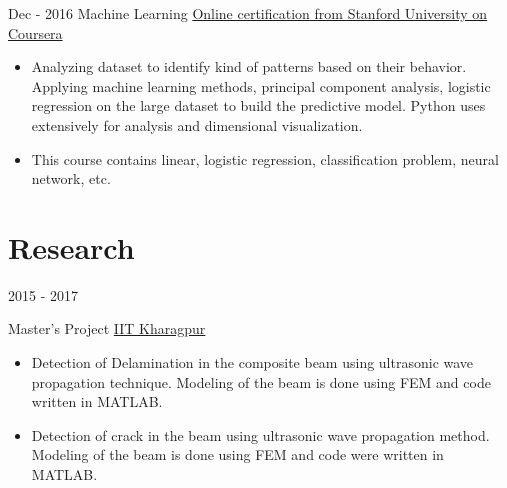 \documentclass[letterpaper]{twentysecondcv} %
\begin{document}
\begin{twenty} %
	
%
    \twentyitem
   		{Dec - 2016 }
   		{}
        {Machine Learning}
        {\href{https://www.coursera.org/accomplishments//}{Online certification from Stanford University on Coursera}}
        {}
        {
         \vspace{-2mm}
        {\begin{itemize}
        \item Analyzing dataset to identify kind of patterns based on their behavior. Applying machine learning methods, principal component analysis, logistic regression on the large dataset to build the predictive model. Python uses extensively for analysis and dimensional visualization.
        \item This course contains linear, logistic regression, classification problem, neural network, etc.
    \end{itemize}}
        }

\end{twenty}
\vspace{3 mm}
\section{Research}
\begin{twenty}
\twentyitem
    	{2015 - 2017}
    	
        {Master's Project}
        {\href{http://http://iitkgp.ac.in//}{IIT Kharagpur}}
        {}
        {
        	\vspace{-3mm}
        {\begin{itemize}
        
        
        \vspace{1.5 mm}
		\item Detection of Delamination in the composite beam using ultrasonic wave propagation technique. Modeling of the beam is done using FEM and code written in MATLAB.
		\item Detection of crack in the beam using ultrasonic wave propagation method. Modeling of the beam is done using FEM and code were written in MATLAB.
\end{itemize}}
        }
\end{twenty}
\end{document}
